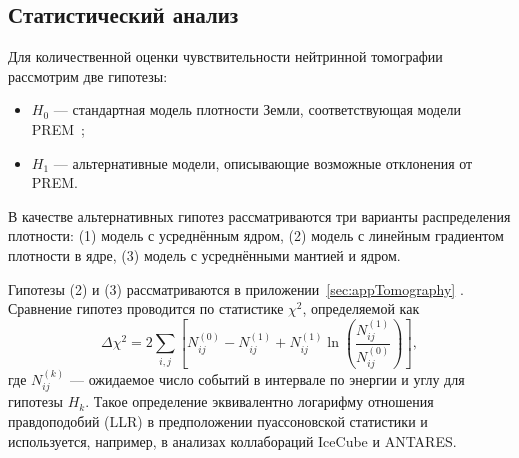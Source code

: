 
\subsection{Статистический анализ}

Для количественной оценки чувствительности нейтринной томографии рассмотрим две гипотезы:  
\begin{itemize}
  \item $H_0$ — стандартная модель плотности Земли, соответствующая модели PREM~\cite{dziewonskiPREM1981};
  \item $H_1$ — альтернативные модели, описывающие возможные отклонения от PREM.
\end{itemize}

В качестве альтернативных гипотез рассматриваются три варианты распределения плотности:  
(1) модель с усреднённым ядром,  
(2) модель с линейным градиентом плотности в ядре,  
(3) модель с усреднёнными мантией и ядром.  

Гипотезы (2) и (3) рассматриваются в приложении~\ref{sec:appTomography}
.
Сравнение гипотез проводится по статистике $\chi^2$, определяемой как
\begin{equation}
\label{eq:chi2_def}
\Delta\chi^2 = 2\sum_{i,j}
\left[
  N_{ij}^{(0)} - N_{ij}^{(1)} 
  + N_{ij}^{(1)}\ln\!\left(\frac{N_{ij}^{(1)}}{N_{ij}^{(0)}}\right)
\right],
\end{equation}
где $N^{(k)}_{ij}$ — ожидаемое число событий в интервале по энергии и углу для гипотезы $H_k$.  
Такое определение эквивалентно логарифму отношения правдоподобий (LLR) в предположении пуассоновской статистики и используется, например, в анализах коллабораций IceCube и ANTARES.

